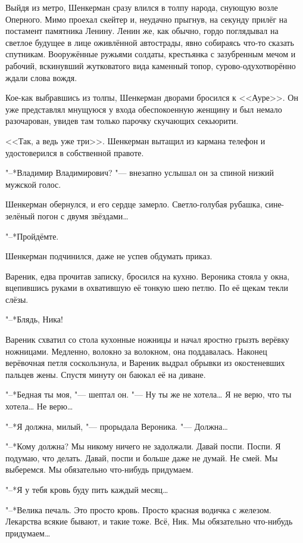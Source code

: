 Выйдя из метро, Шенкерман сразу влился в толпу народа, снующую возле Оперного.
Мимо проехал скейтер и, неудачно прыгнув, на секунду прилёг на постамент памятника Ленину.
Ленин же, как обычно, гордо поглядывал на светлое будущее в лице оживлённой автострады, явно собираясь что-то сказать спутникам.
Вооружённые ружьями солдаты, крестьянка с зазубренным мечом и рабочий, вскинувший жутковатого вида каменный топор, сурово-одухотворённо ждали слова вождя.

Кое-как выбравшись из толпы, Шенкерман дворами бросился к <<Ауре>>.
Он уже представлял мнущуюся у входа обеспокоенную женщину и был немало разочарован, увидев там только парочку скучающих секьюрити.

<<Так, а ведь уже три>>.
Шенкерман вытащил из кармана телефон и удостоверился в собственной правоте.

"--*Владимир Владимирович? "--- внезапно услышал он за спиной низкий мужской голос.

Шенкерман обернулся, и его сердце замерло.
Светло-голубая рубашка, сине-зелёный погон с двумя звёздами\ldots{}

"--*Пройдёмте.

Шенкерман подчинился, даже не успев обдумать приказ.

\asterism

Вареник, едва прочитав записку, бросился на кухню.
Вероника стояла у окна, вцепившись руками в охватившую её тонкую шею петлю.
По её щекам текли слёзы.

"--*Блядь, Ника!

Вареник схватил со стола кухонные ножницы и начал яростно грызть верёвку ножницами.
Медленно, волокно за волокном, она поддавалась.
Наконец верёвочная петля соскользнула, и Вареник выдрал обрывки из окостеневших пальцев жены.
Спустя минуту он баюкал её на диване.

"--*Бедная ты моя, "--- шептал он.
"--- Ну ты же не хотела\ldots{}
Я не верю, что ты хотела\ldots{}
Не верю\ldots{}

"--*Я должна, милый, "--- прорыдала Вероника.
"--- Должна\ldots{}

"--*Кому должна?
Мы никому ничего не задолжали.
Давай поспи.
Поспи.
Я подумаю, что делать.
Давай, поспи и больше даже не думай.
Не смей.
Мы выберемся.
Мы обязательно что-нибудь придумаем.

"--*Я у тебя кровь буду пить каждый месяц\ldots{}

"--*Велика печаль.
Это просто кровь.
Просто красная водичка с железом.
Лекарства всякие бывают, и такие тоже.
Всё, Ник.
Мы обязательно что-нибудь придумаем\ldots{}

